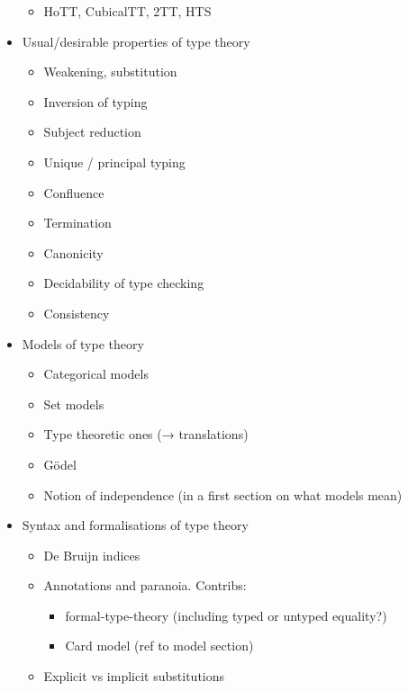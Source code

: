 \begin{itemize}
\begin{itemize}
      \item HoTT, CubicalTT, 2TT, HTS
    \end{itemize}
  \item Usual/desirable properties of type theory
    \begin{itemize}
      \item Weakening, substitution
      \item Inversion of typing
      \item Subject reduction
      \item Unique / principal typing
      \item Confluence
      \item Termination
      \item Canonicity
      \item Decidability of type checking
      \item Consistency
    \end{itemize}
  \item Models of type theory
    \begin{itemize}
      \item Categorical models
      \item Set models
      \item Type theoretic ones (→ translations)
      \item Gödel
      \item Notion of independence (in a first section on what models mean)
    \end{itemize}
  \item Syntax and formalisations of type theory
    \begin{itemize}
      \item De Bruijn indices
      \item Annotations and paranoia. Contribs:
        \begin{itemize}
          \item formal-type-theory (including typed or untyped equality?)
          \item Card model (ref to model section)
        \end{itemize}
      \item Explicit vs implicit substitutions

\end{itemize}
\end{itemize}

